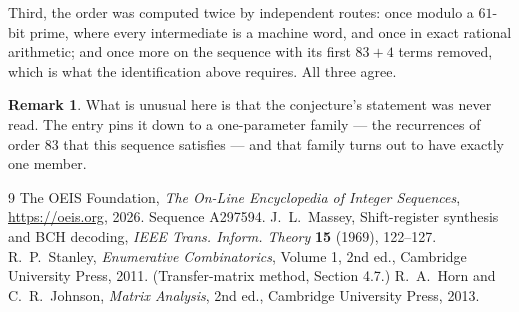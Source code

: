 \documentclass[11pt,a4paper]{article}
\theoremstyle{plain}
\theoremstyle{definition}
\newtheorem{remark}[theorem]{Remark}
\begin{document}
Third, the order was computed twice by independent routes: once modulo a $61$-bit prime, where
every intermediate is a machine word, and once in exact rational arithmetic; and once more on
the sequence with its first $83+4$ terms removed, which is what the identification above
requires. All three agree.

\begin{remark}
What is unusual here is that the conjecture's statement was never read. The entry pins it down
to a one-parameter family --- the recurrences of order $83$ that this sequence satisfies
--- and that family turns out to have exactly one member.
\end{remark}

\begin{thebibliography}{9}
 The OEIS Foundation, \emph{The On-Line Encyclopedia of Integer
Sequences}, \url{https://oeis.org}, 2026. Sequence A297594.
 J.~L.~Massey, Shift-register synthesis and BCH decoding, \emph{IEEE
Trans. Inform. Theory} \textbf{15} (1969), 122--127.
 R.~P.~Stanley, \emph{Enumerative Combinatorics}, Volume 1, 2nd ed.,
Cambridge University Press, 2011. (Transfer-matrix method, Section 4.7.)
 R.~A.~Horn and C.~R.~Johnson, \emph{Matrix Analysis}, 2nd ed., Cambridge
University Press, 2013.
\end{thebibliography}
\end{document}
